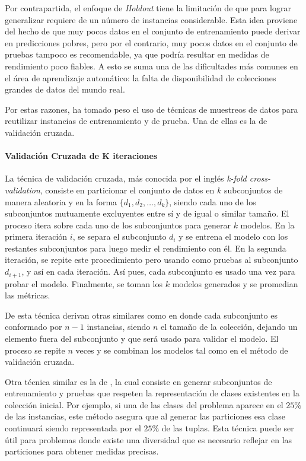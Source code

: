 Por contrapartida, el enfoque de \textit{Holdout} tiene la limitación de que
para lograr generalizar requiere de un número de instancias considerable.
 Esta idea proviene del hecho de que muy pocos datos en el
conjunto de entrenamiento puede derivar en predicciones pobres, pero por el
contrario, muy pocos datos en el conjunto de pruebas tampoco es recomendable, ya
que podría resultar en medidas de rendimiento poco fiables. A esto se suma una
de las dificultades más comunes en el área de aprendizaje automático: la falta
de disponibilidad de colecciones grandes de datos del mundo real. 

Por estas razones, ha tomado peso el uso de técnicas de muestreos de datos para
reutilizar instancias de entrenamiento y de prueba. Una de ellas es la de
validación cruzada.

\paragraph{Validación Cruzada de K iteraciones} 

La técnica de validación cruzada, más conocida por el inglés \textit{k-fold
cross-validation}, consiste en particionar el conjunto de datos en $k$
subconjuntos de manera aleatoria y en la forma $\{d_{1}, d_{2},  \dots, d_{k}
\}$, siendo cada uno de los subconjuntos mutuamente excluyentes entre sí y de
igual o similar tamaño. El proceso itera sobre cada uno de los subconjuntos para
generar $k$ modelos. En la primera iteración $i$, se separa el subconjunto
$d_{i}$ y se entrena el modelo con los restantes subconjuntos para luego medir
el rendimiento con él. En la segunda iteración, se repite este procedimiento
pero usando como pruebas al subconjunto $d_{i+1}$, y así en cada iteración. Así
pues, cada subconjunto es usado una vez para probar el modelo. Finalmente, se
toman los $k$ modelos generados y se promedian las métricas. 

De esta técnica derivan otras similares como 
en donde cada subconjunto es conformado por $n-1$ instancias, siendo $n$ el
tamaño de la colección, dejando un elemento fuera del subconjunto y que será
usado para validar el modelo. El proceso se repite $n$ veces y se combinan los
modelos tal como en el método de validación cruzada. 

Otra técnica similar es la de , la
cual consiste en generar subconjuntos de entrenamiento y pruebas que respeten la
representación de clases existentes en la colección inicial. Por ejemplo, si una
de las clases del problema aparece en el $25\%$ de las instancias, este método
asegura que al generar las particiones esa clase continuará siendo representada
por el $25\%$ de las tuplas. Esta técnica puede ser útil para problemas donde
existe una diversidad que es necesario reflejar en las particiones para obtener
medidas precisas.

